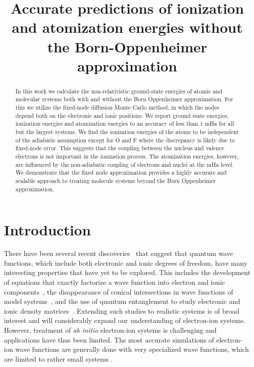\documentclass[pra,superscriptaddress,groupedaddress,twocolumn]{revtex4}
\begin{document}
\title{Accurate predictions of ionization and atomization energies without the Born-Oppenheimer approximation}

\begin{abstract}
In this work we calculate the non-relativistic ground-state energies of atomic and molecular systems both with and without the Born Oppenheimer approximation. For this we utilize the fixed-node diffusion Monte Carlo method, in which the nodes depend both on the electronic and ionic positions. We report ground state energies, ionization energies and atomization energies to an accuracy of less than $1$ mHa for all but the largest systems. We find the ionization energies of the atoms to be independent of the adiabatic assumption except for O and F where the discrepancy is likely due to fixed-node error. This suggests that the coupling between the nucleus and valence electrons is not important in the ionization process. The atomization energies, however, are influenced by the non-adiabatic coupling of electrons and nuclei at the mHa level. We demonstrate that the fixed node approximation provides a highly accurate and scalable approach to treating molecule systems beyond the Born Oppenheimer approximation.
\end{abstract}
\maketitle

\section{Introduction}
There have been several recent discoveries~\cite{cederbaum1,gross2014,boent} that suggest that quantum wave functions, which include both electronic and ionic degrees of freedom, have many interesting properties that have yet to be explored.  This includes the development of equations that exactly factorize a wave function into electron and ionic components~\cite{cederbaum1}, the disappearance of conical intersections in wave functions of model systems~\cite{gross2014}, and the use of quantum entanglement to study electronic and ionic density matrices~\cite{boent}.  Extending such studies to realistic systems is of broad interest and will considerably expand our understanding of electron-ion systems. However, treatment of \textit{ab initio} electron-ion systems is challenging and applications have thus been limited.   The most accurate simulations of electron-ion wave functions are generally done with very specialized wave functions, which are limited to rather small systems \cite{mitroy2013}.  
\end{document}
